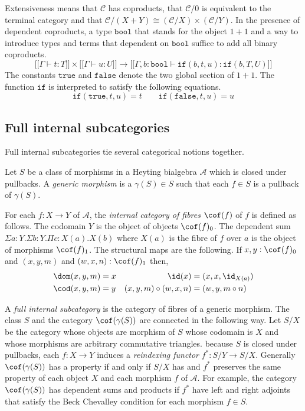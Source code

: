 \documentclass{tac}
\newcommand\cat\mathcal
\newcommand\ri{^*}
\newcommand\of{:}
\newcommand\db[1]{{[\![}#1{]\!]}}
\newcommand\gen\gamma
\newcommand\true{\mathtt{true}}
\newcommand\false{\mathtt{false}}
\newcommand\bool{\mathtt{bool}}
\newcommand\ttif{\mathtt{if}}
\begin{document}
Extensiveness means that $\cat C$ has coproducts, that $\cat C/0$ is equivalent to the terminal category and that $\cat C/(X+Y)\cong (\cat C/X)\times(\cat C/Y)$. In the presence of dependent coproducts, a type $\bool$ that stands for the object $1+1$ and a way to introduce types and terms that dependent on $\bool$ suffice to add all binary coproducts.
\[ \db{\Gamma\vdash t\of T}\times\db{\Gamma\vdash u\of U}\to\db{\Gamma,b\of\bool\vdash \ttif(b,t,u)\of\ttif(b,T,U)} \]
The constants $\true$ and $\false$ denote the two global section of $1+1$. The function $\ttif$ is interpreted to satisfy the following equations.
\[ \ttif(\true,t,u)=t\qquad\ttif(\false,t,u) = u\]

\subsection{Full internal subcategories}\label{full internal subcategory}
Full internal subcategories tie several categorical notions together. 

Let $S$ be a class of morphisms in a Heyting bialgebra $\cat A$ which is closed under pullbacks. A \emph{generic morphism} is a $\gen(S)\in S$ such that each $f\in S$ is a pullback of $\gen(S)$.


For each $f\of X\to Y$ of $\cat A$, the \emph{internal category of fibres} $\cof(f)$ of $f$ is defined as follows. The codomain $Y$ is the object of objects $\cof(f)_0$. The dependent sum $\Sigma a\of Y.\Sigma b\of Y.\Pi c\of X(a).X(b)$ where $X(a)$ is the fibre of $f$ over $a$ is the object of morphisms $\cof(f)_1$. The structural maps are the following. If $x,y\of \cof(f)_0$ and $(x,y,m)$ and $(w,x,n)\of\cof(f)_1$ then,
\begin{align*}
\dom(x,y,m) &= x & 
\id(x) &= (x,x,\id_{X(a)})\\
\cod(x,y,m) &= y &
(x,y,m)\circ (w,x,n) &= (w,y,m\circ n)
\end{align*}\label{category of fibres}

A \emph{full internal subcategory} is the category of fibres of a generic morphism. The class $S$ and the category $\cof(\gen(S))$ are connected in the following way. Let $S/X$ be the category whose objects are morphism of $S$ whose codomain is $X$ and whose morphisms are arbitrary commutative triangles. because $S$ is closed under pullbacks, each $f\of X\to Y$ induces a \emph{reindexing functor} $f\ri\of S/Y\to S/X$. Generally $\cof(\gen(S))$ has a property if and only if $S/X$ has and $f\ri$ preserves the same property of each object $X$ and each morphism $f$ of $\cat A$. For example, the category $\cof(\gen(S))$ has dependent sums and products if $f\ri$ have left and right adjoints that satisfy the Beck Chevalley condition for each morphism $f\in S$.
\end{document}
